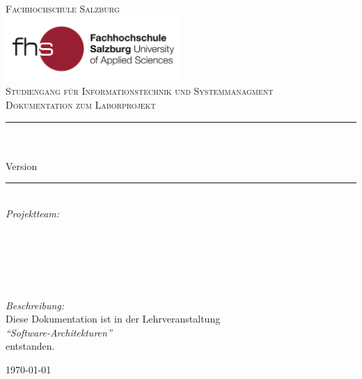 \begin{titlepage}

\begin{center}



\textsc{\LARGE Fachhochschule Salzburg}\\[1.5cm]
\includegraphics[width=0.5\textwidth]{title/FH-Salzburg_RGB.jpg}\\[1cm]

\textsc{\LARGE Studiengang für Informationstechnik und Systemmanagment}\\[1.5cm]

\textsc{\Large Dokumentation zum Laborprojekt}\\[0.5cm]


\newcommand{\HRule}{\rule{\linewidth}{0.5mm}}
\HRule \\[0.5cm]
{ \huge \bfseries \projectName}\\[0.4cm]
Version \vhCurrentVersion

\HRule \\[1.5cm]


 \large
\emph{Projektteam:}\\ 

\LA \\
\AR \\
\PR \\
\FS \\
\MT \\


\hfill

\emph{Beschreibung:}\\
Diese Dokumentation ist in der Lehrveranstaltung\\ \textit{"`Software-Architekturen"'}\\ entstanden.

\vfill

{\large \today}

\end{center}

\end{titlepage}
